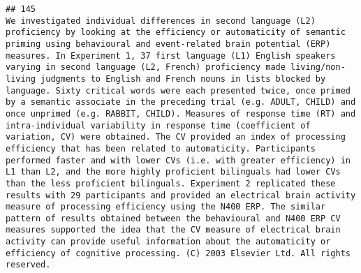 \documentclass[
  english,
  man]{apa6}
\begin{document}
\begin{verbatim}
## 145                                                                                                                                                                                                                                                                                                                                                                                                                                                                                                                                                                                                                                                                                                                                                                                                                                                                                                                                                                                                                                                                                                                                                                                       We investigated individual differences in second language (L2) proficiency by looking at the efficiency or automaticity of semantic priming using behavioural and event-related brain potential (ERP) measures. In Experiment 1, 37 first language (L1) English speakers varying in second language (L2, French) proficiency made living/non-living judgments to English and French nouns in lists blocked by language. Sixty critical words were each presented twice, once primed by a semantic associate in the preceding trial (e.g. ADULT, CHILD) and once unprimed (e.g. RABBIT, CHILD). Measures of response time (RT) and intra-individual variability in response time (coefficient of variation, CV) were obtained. The CV provided an index of processing efficiency that has been related to automaticity. Participants performed faster and with lower CVs (i.e. with greater efficiency) in L1 than L2, and the more highly proficient bilinguals had lower CVs than the less proficient bilinguals. Experiment 2 replicated these results with 29 participants and provided an electrical brain activity measure of processing efficiency using the N400 ERP. The similar pattern of results obtained between the behavioural and N400 ERP CV measures supported the idea that the CV measure of electrical brain activity can provide useful information about the automaticity or efficiency of cognitive processing. (C) 2003 Elsevier Ltd. All rights reserved.

\end{verbatim}
\end{document}
